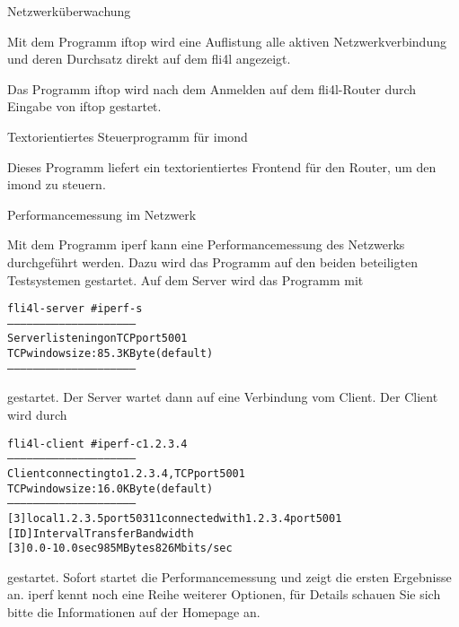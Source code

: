 \begin{description}
 Netzwerküberwachung

    Mit dem Programm iftop wird eine Auflistung alle aktiven
    Netzwerkverbindung und deren Durchsatz direkt auf dem fli4l
    angezeigt.

    Das Programm iftop wird nach dem Anmelden auf dem fli4l-Router
    durch Eingabe von iftop gestartet.

 Textorientiertes Steuerprogramm für imond

    Dieses Programm liefert ein textorientiertes Frontend für den Router, um
    den imond zu steuern.

 Performancemessung im Netzwerk

    Mit dem Programm iperf kann eine Performancemessung des Netzwerks
    durchgeführt werden. Dazu wird das Programm auf den beiden beteiligten
    Testsystemen gestartet. Auf dem Server wird das Programm mit

\begin{example}
\begin{alltt}
fli4l-server \version~\# iperf -s
------------------------------------------------------------
Server listening on TCP port 5001
TCP window size: 85.3 KByte (default)
------------------------------------------------------------
\end{alltt}
\end{example}

    gestartet. Der Server wartet dann auf eine Verbindung vom Client. Der
    Client wird durch

\begin{example}
\begin{alltt}
fli4l-client \version~\# iperf -c 1.2.3.4
------------------------------------------------------------
Client connecting to 1.2.3.4, TCP port 5001
TCP window size: 16.0 KByte (default)
------------------------------------------------------------
[  3] local 1.2.3.5 port 50311 connected with 1.2.3.4 port 5001
[ ID] Interval       Transfer     Bandwidth
[  3]  0.0-10.0 sec    985 MBytes    826 Mbits/sec
\end{alltt}
\end{example}

    gestartet. Sofort startet die Performancemessung und zeigt die ersten
    Ergebnisse an. iperf kennt noch eine Reihe weiterer Optionen, für Details
    schauen Sie sich bitte die Informationen auf der Homepage
     an.


\end{description}
